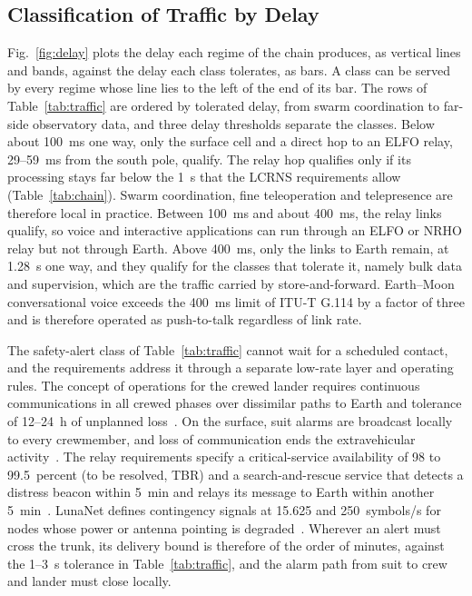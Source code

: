 \documentclass{IEEEoj}
\begin{document}
\subsection{Classification of Traffic by Delay}
Fig.~\ref{fig:delay} plots the delay each regime of the chain produces, as vertical lines and bands, against the delay each class tolerates, as bars. A class can be served by every regime whose line lies to the left of the end of its bar. The rows of Table~\ref{tab:traffic} are ordered by tolerated delay, from swarm coordination to far-side observatory data, and three delay thresholds separate the classes. Below about \SI{100}{ms} one way, only the surface cell and a direct hop to an ELFO relay, \SI{29}{}--\SI{59}{ms} from the south pole, qualify. The relay hop qualifies only if its processing stays far below the \SI{1}{s} that the LCRNS requirements allow (Table~\ref{tab:chain}). Swarm coordination, fine teleoperation and telepresence are therefore local in practice. Between \SI{100}{ms} and about \SI{400}{ms}, the relay links qualify, so voice and interactive applications can run through an ELFO or NRHO relay but not through Earth. Above \SI{400}{ms}, only the links to Earth remain, at \SI{1.28}{\second} one way, and they qualify for the classes that tolerate it, namely bulk data and supervision, which are the traffic carried by store-and-forward. Earth--Moon conversational voice exceeds the \SI{400}{ms} limit of ITU-T G.114 by a factor of three and is therefore operated as push-to-talk regardless of link rate.

The safety-alert class of Table~\ref{tab:traffic} cannot wait for a scheduled contact, and the requirements address it through a separate low-rate layer and operating rules. The concept of operations for the crewed lander requires continuous communications in all crewed phases over dissimilar paths to Earth and tolerance of 12--24~h of unplanned loss~\cite{hls_conop008}. On the surface, suit alarms are broadcast locally to every crewmember, and loss of communication ends the extravehicular activity~\cite{eva_conops}. The relay requirements specify a critical-service availability of 98 to 99.5~percent (to be resolved, TBR) and a search-and-rescue service that detects a distress beacon within \SI{5}{min} and relays its message to Earth within another \SI{5}{min}~\cite{nasa_lunar_relay_srd}. LunaNet defines contingency signals at 15.625 and 250~symbols/s for nodes whose power or antenna pointing is degraded~\cite{lnis_v5}. Wherever an alert must cross the trunk, its delivery bound is therefore of the order of minutes, against the 1--3~s tolerance in Table~\ref{tab:traffic}, and the alarm path from suit to crew and lander must close locally.
\end{document}
